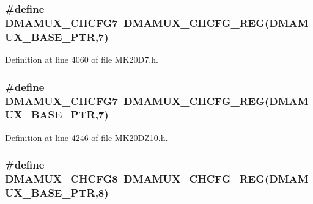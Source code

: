 \subsubsection[{\texorpdfstring{D\+M\+A\+M\+U\+X\+\_\+\+C\+H\+C\+F\+G7}{DMAMUX_CHCFG7}}]{\setlength{\rightskip}{0pt plus 5cm}\#define D\+M\+A\+M\+U\+X\+\_\+\+C\+H\+C\+F\+G7~{\bf D\+M\+A\+M\+U\+X\+\_\+\+C\+H\+C\+F\+G\+\_\+\+R\+EG}({\bf D\+M\+A\+M\+U\+X\+\_\+\+B\+A\+S\+E\+\_\+\+P\+TR},7)}\hypertarget{group___d_m_a_m_u_x___register___accessor___macros_gaca9b7f4e8c1eff908f602d0f03dbdced}{}\label{group___d_m_a_m_u_x___register___accessor___macros_gaca9b7f4e8c1eff908f602d0f03dbdced}


Definition at line 4060 of file M\+K20\+D7.\+h.

\subsubsection[{\texorpdfstring{D\+M\+A\+M\+U\+X\+\_\+\+C\+H\+C\+F\+G7}{DMAMUX_CHCFG7}}]{\setlength{\rightskip}{0pt plus 5cm}\#define D\+M\+A\+M\+U\+X\+\_\+\+C\+H\+C\+F\+G7~{\bf D\+M\+A\+M\+U\+X\+\_\+\+C\+H\+C\+F\+G\+\_\+\+R\+EG}({\bf D\+M\+A\+M\+U\+X\+\_\+\+B\+A\+S\+E\+\_\+\+P\+TR},7)}\hypertarget{group___d_m_a_m_u_x___register___accessor___macros_gaca9b7f4e8c1eff908f602d0f03dbdced}{}\label{group___d_m_a_m_u_x___register___accessor___macros_gaca9b7f4e8c1eff908f602d0f03dbdced}


Definition at line 4246 of file M\+K20\+D\+Z10.\+h.

\subsubsection[{\texorpdfstring{D\+M\+A\+M\+U\+X\+\_\+\+C\+H\+C\+F\+G8}{DMAMUX_CHCFG8}}]{\setlength{\rightskip}{0pt plus 5cm}\#define D\+M\+A\+M\+U\+X\+\_\+\+C\+H\+C\+F\+G8~{\bf D\+M\+A\+M\+U\+X\+\_\+\+C\+H\+C\+F\+G\+\_\+\+R\+EG}({\bf D\+M\+A\+M\+U\+X\+\_\+\+B\+A\+S\+E\+\_\+\+P\+TR},8)}\hypertarget{group___d_m_a_m_u_x___register___accessor___macros_ga6175e989543915c1f2fe0d3e1b03b7d7}{}\label{group___d_m_a_m_u_x___register___accessor___macros_ga6175e989543915c1f2fe0d3e1b03b7d7}


